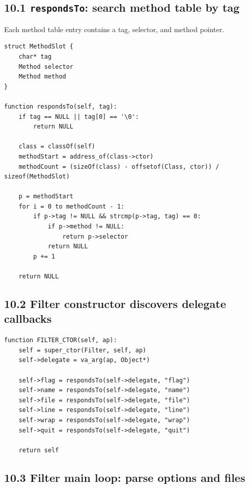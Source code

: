 \documentclass[11pt]{article}
\begin{document}
\subsection{\texorpdfstring{10.1 \texttt{respondsTo}: search method
table by
tag}{10.1 respondsTo: search method table by tag}}\label{respondsto-search-method-table-by-tag}

Each method table entry contains a tag, selector, and method pointer.

\begin{verbatim}
struct MethodSlot {
    char* tag
    Method selector
    Method method
}

function respondsTo(self, tag):
    if tag == NULL || tag[0] == '\0':
        return NULL

    class = classOf(self)
    methodStart = address_of(class->ctor)
    methodCount = (sizeOf(class) - offsetof(Class, ctor)) / sizeof(MethodSlot)

    p = methodStart
    for i = 0 to methodCount - 1:
        if p->tag != NULL && strcmp(p->tag, tag) == 0:
            if p->method != NULL:
                return p->selector
            return NULL
        p += 1

    return NULL
\end{verbatim}

\subsection{10.2 Filter constructor discovers delegate
callbacks}\label{filter-constructor-discovers-delegate-callbacks}

\begin{verbatim}
function FILTER_CTOR(self, ap):
    self = super_ctor(Filter, self, ap)
    self->delegate = va_arg(ap, Object*)

    self->flag = respondsTo(self->delegate, "flag")
    self->name = respondsTo(self->delegate, "name")
    self->file = respondsTo(self->delegate, "file")
    self->line = respondsTo(self->delegate, "line")
    self->wrap = respondsTo(self->delegate, "wrap")
    self->quit = respondsTo(self->delegate, "quit")

    return self
\end{verbatim}

\subsection{10.3 Filter main loop: parse options and
files}\label{filter-main-loop-parse-options-and-files}
\end{document}
